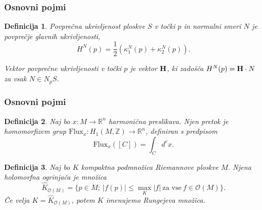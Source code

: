 \documentclass[9pt, table]{beamer}
\newtheorem{definicija}{Definicija}
\newcommand{\R}{\mathbb R}
\newcommand{\Z}{\mathbb Z}
\begin{document}

\begin{frame}
\frametitle{Osnovni pojmi}

\begin{definicija}
{\color{blue} Povprečna ukrivljenost} ploskve $S$ v točki $p$ in normalni smeri $N$ je povprečje glavnih ukrivljenosti,
\begin{equation}
H^{N}(p) = \frac{1}{2} \left(\kappa _{1}^{N}(p) + \kappa _{2}^{N}(p) \right).
\end{equation}

{\color{blue} Vektor povprečne ukrivljenosti} v točki $p$ je vektor $\textbf{\textup{H}}$, ki zadošča $H^{N}(p) = \textbf{\textup{H}} \cdot N$ za vsak $N \in N_{p}S$.
\end{definicija}

\end{frame}


\begin{frame}
\frametitle{Osnovni pojmi}

\begin{definicija}
Naj bo $x \colon M \to \R^{n}$ harmonična preslikava. Njen {\color{blue} pretok} je homomorfizem grup $\mathrm{Flux}_{x} \colon H_{1} (M, \Z) \to \R^{n}$, definiran s predpisom 
\begin{equation} 
\mathrm{Flux}_{x} ([C]) = \int_{C} {d^{c} x}.
\end{equation}
\end{definicija}
\pause

\begin{definicija}
Naj bo $K$ kompaktna podmnožica Riemannove ploskve $M$. Njena {\color{blue} holomorfna ogrinjača} je množica 
\begin{equation}
\widehat{K}_{\mathcal{O}(M)} = \{p \in M ; \ |f(p)| \leq \max_{K} |f| \ \text{za vse} \ f \in \mathcal{O}(M) \}.
\end{equation}
Če velja $K = \widehat{K}_{\mathcal{O}(M)}$, potem $K$ imenujemo {\color{blue} Rungejeva množica}.
\end{definicija}

\end{frame}

\end{document}

